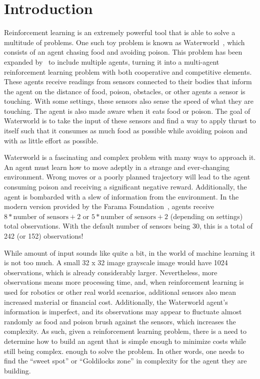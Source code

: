 \section{Introduction}\label{sec:introduction}
Reinforcement learning is an extremely powerful tool that is able to solve a multitude
of problems.
One such toy problem is known as Waterworld~\cite{Karpathy2015, Ho2016}, which consists
of an agent chasing food and avoiding poison.
This problem has been expanded by~\cite{Gupta2017} to include multiple agents,
turning it into a multi-agent reinforcement learning problem with both cooperative
and competitive elements.
These agents receive readings from sensors connected to their bodies that
inform the agent on the distance of food, poison, obstacles, or other agents a sensor
is touching.
With some settings, these sensors also sense the speed of what they are touching.
The agent is also made aware when it eats food or poison.
The goal of Waterworld is to take the input of these sensors and find a way to apply
thrust to itself such that it consumes as much food as possible while avoiding poison
and with as little effort as possible.

Waterworld is a fascinating and complex problem with many ways to approach it.
An agent must learn how to move adeptly in a strange and ever-changing environment.
Wrong moves or a poorly planned trajectory will lead to the agent consuming poison
and receiving a significant negative reward.
Additionally, the agent is bombarded with a slew of information from the environment.
In the modern version provided by the Farama Foundation~\cite{WaterworldDocumentation},
agents receive $8 * \text{number of sensors} + 2$ or
$5 * \text{number of sensors} + 2$ (depending on settings) total observations.
With the default number of sensors being 30, this is a total of 242 (or 152)
observations!

While amount of input sounds like quite a bit, in the world of machine learning it is
not too much.
A small 32 x 32 image grayscale image would have 1024 observations, which is already
considerably larger.
Nevertheless, more observations means more processing time, and, when reinforcement
learning is used for robotics or other real world scenarios, additional sensors also
mean increased material or financial cost.
Additionally, the Waterworld agent's information is imperfect, and its observations
may appear to fluctuate almost randomly as food and poison brush against the sensors,
which increases the complexity.
As such, given a reinforcement learning problem, there is a need to determine how to
build an agent that is simple enough to minimize costs while still being complex.
enough to solve the problem.
In other words, one needs to find the ``sweet spot'' or ``Goldilocks zone'' in
complexity for the agent they are building.

